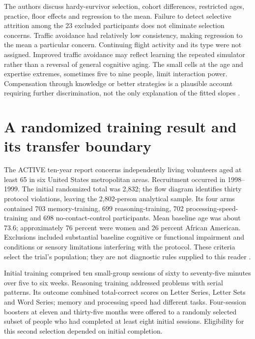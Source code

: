 The authors discuss hardy-survivor selection, cohort differences,
restricted ages, practice, floor effects and regression to the mean.
Failure to detect selective attrition among the 23 excluded participants
does not eliminate selection concerns. Traffic avoidance had relatively
low consistency, making regression to the mean a particular concern.
Continuing flight activity and its type were not assigned. Improved
traffic avoidance may reflect learning the repeated simulator rather than
a reversal of general cognitive aging. The small cells at the age and
expertise extremes, sometimes five to nine people, limit interaction
power. Compensation through knowledge or better strategies is a plausible
account requiring further discrimination, not the only explanation of
the fitted slopes \cite[pp.~652--654]{TaylorKennedyNodaYesavage2007Pilot}.

\section{A randomized training result and its transfer boundary}
\label{sec:p19-aging-training}

The ACTIVE ten-year report concerns independently living volunteers aged
at least 65 in six United States metropolitan areas. Recruitment occurred
in 1998--1999. The initial randomized total was 2,832; the flow diagram
identifies thirty protocol violations, leaving the 2,802-person analytical
sample. Its four arms contained 703 memory-training, 699 reasoning-training,
702 processing-speed-training and 698 no-contact-control participants.
Mean baseline age was about 73.6; approximately 76 percent were women
and 26 percent African American. Exclusions included substantial
baseline cognitive or functional impairment and conditions or sensory
limitations interfering with the protocol. These criteria select the
trial's population; they are not diagnostic rules supplied to this reader
\cite[Methods, Results, figure~1 and table~1]{RebokEtAl2014ACTIVE}.

Initial training comprised ten small-group sessions of sixty to
seventy-five minutes over five to six weeks. Reasoning training addressed
problems with serial patterns. Its outcome combined total-correct scores
on Letter Series, Letter Sets and Word Series; memory and processing
speed had different tasks. Four-session boosters at eleven and
thirty-five months were offered to a randomly selected subset of people
who had completed at least eight initial sessions. Eligibility for this
second selection depended on initial completion.

